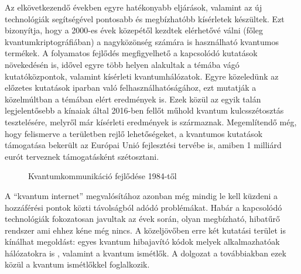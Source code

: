  Az elkövetkezendő években egyre hatékonyabb eljárások, valamint az új technológiák segítségével pontosabb és megbízhatóbb kísérletek készültek. Ezt bizonyítja, hogy a 2000-es évek közepétől kezdtek elérhetővé válni (főleg kvantumkriptográfiában) a nagyközönség számára is használható kvantumos termékek. A folyamatos fejlődés megfigyelhető a kapcsolódó kutatások növekedésén is, idővel egyre több helyen alakultak a témába vágó kutatóközpontok, valamint kísérleti kvantumhálózatok. Egyre közeledünk az előzetes kutatások iparban való felhasználhatóságához, ezt mutatják a közelmúltban a témában elért eredmények is. Ezek közül az egyik talán legjelentősebb a kínaiak által 2016-ben fellőt műhold\cite{chinasat} kvantum kulcsszétosztás tesztelésére, melyről már kísérleti eredmények is származnak\cite{yin2017satellite}. Megemlítendő még, hogy felismerve a területben rejlő lehetőségeket, a kvantumos kutatások támogatása bekerült az Európai Unió fejlesztési tervébe is, amiben 1 milliárd eurót terveznek támogatásként szétosztani.\cite{manifesto}\\
 \begin{figure}[h]
\centering
{}
\caption[Kvantumkommunikáció timeline]{Kvantumkommunikáció fejlődése 1984-től}
\end{figure}
A ``kvantum internet''\cite{kimble2008quantum}\cite{pirandola2016unite} megvalósítához azonban még mindig le kell küzdeni a hozzáférési pontok közti távolságból adódó problémákat. Habár a kapcsolódó technológiák fokozatosan javultak az évek során, olyan megbízható, hibatűrő rendszer ami ehhez kéne még nincs. A közeljövőben erre két kutatási terület is kínálhat megoldást: egyes kvantum hibajavító kódok\cite{lidar2013quantum} melyek alkalmazhatóak hálózatokra is \cite{zhang2013quantum}, valamint a kvantum ismétlők\cite{uphoff2016integrated}\cite{krovi2016practical}\cite{pfister2016quantum}\cite{li2016heralded}. A dolgozat a továbbiakban ezek közül a kvantum ismétlőkkel foglalkozik.



